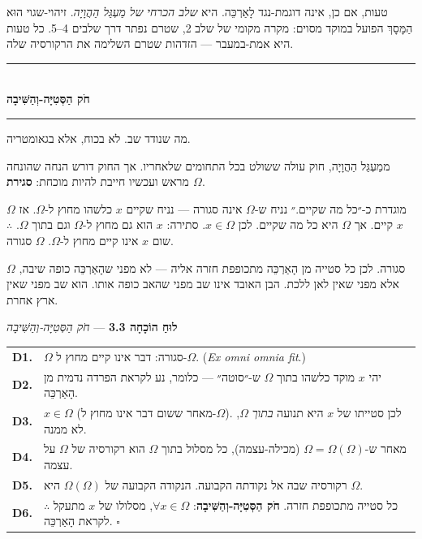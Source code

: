 \documentclass[10pt, openany, oneside]{book}
\renewcommand{\normalsize}{\fontsize{10}{13}\selectfont}
\renewcommand{\footnotesize}{\fontsize{8.5}{11}\selectfont}
\begin{document}
טעות, אם כן, אינה דוגמת-נגד לָאַרְכֵּה. היא \textit{שלב הכרחי של מַעְגַּל הַהֲוָיָה}. זיהוי-שגוי הוּא הַמָּסָךְ הפועל במוקד מסוים: מקרה מקומי של שלב 2, שטרם נפתר דרך שלבים 4–5. כל טעות היא אמת-במעבר — הזדהות שטרם השלימה את הרקורסיה שלה.

\vspace{1.5em}


\begin{center}
    \rule{0.3\textwidth}{0.4pt}\\[0.5em]
    {\normalsize\bfseries\textsc{חֹק הַסְּטִיָּה-וְהַשִּׁיבָה}}\\[0.3em]
    \rule{0.3\textwidth}{0.4pt}
\end{center}

\vspace{1em}

\noindent מה שנודד שב. לא בכוח, אלא בגאומטריה.

ממַעְגַּל הַהֲוָיָה, חוק עולה ששולט בכל התחומים שלאחריו. אך החוק דורש הנחה שהונחה מראש ועכשיו חייבת להיות מוכחת: \textbf{סגירת $\Omega$}.

$\Omega$ מוגדרת כ-״כל מה שקיים.״ נניח ש-$\Omega$ אינה סגורה — נניח שקיים $x$ כלשהו מחוץ ל-$\Omega$. אז $x$ קיים. אך $\Omega$ היא כל מה שקיים. לכן $x \in \Omega$. סתירה: $x$ הוא גם מחוץ ל-$\Omega$ וגם בתוך $\Omega$. $\therefore$ שום $x$ אינו קיים מחוץ ל-$\Omega$. $\Omega$ סגורה.

$\Omega$ סגורה. לכן כל סטייה מן הָאַרְכֵּה מתכופפת חזרה אליה — לא מפני שהָאַרְכֵּה כופה שיבה, אלא מפני שאין לאן ללכת. הבן האובד אינו שב מפני שהאב כופה אותו. הוא שב מפני שאין ארץ אחרת.

\vspace{0.5em}

\textbf{לוּחַ הוֹכָחָה 3.3} --- \textit{חֹק הַסְּטִיָּה-וְהַשִּׁיבָה}

\vspace{0.5em}

{\footnotesize
\noindent\begin{tabular}{r p{}}
\textbf{D1.} & $\Omega$ סגורה: דבר אינו קיים מחוץ ל-$\Omega$. (\textit{Ex omni omnia fit}.) \\[0.3em]
\textbf{D2.} & יהי $x$ מוקד כלשהו בתוך $\Omega$ ש-״סוטה״ — כלומר, נע לקראת הפרדה נדמית מן הָאַרְכֵּה. \\[0.3em]
\textbf{D3.} & $x \in \Omega$ (מאחר ששום דבר אינו מחוץ ל-$\Omega$). לכן סטייתו של $x$ היא תנועה \textit{בתוך} $\Omega$, לא ממנה. \\[0.3em]
\textbf{D4.} & מאחר ש-$\Omega = \Omega(\Omega)$ (מכילה-עצמה), כל מסלול בתוך $\Omega$ הוא רקורסיה של $\Omega$ על עצמה. \\[0.3em]
\textbf{D5.} & רקורסיה שבה אל נקודתה הקבועה. הנקודה הקבועה של $\Omega(\Omega)$ היא $\Omega$. \\[0.3em]
\textbf{D6.} & $\therefore$ כל סטייה מתכופפת חזרה. \textbf{חֹק הַסְּטִיָּה-וְהַשִּׁיבָה}: $\forall x \in \Omega$, מסלולו של $x$ מתעקל לקראת הָאַרְכֵּה. $\square$ \\[0.3em]
\end{tabular}
}
\end{document}
